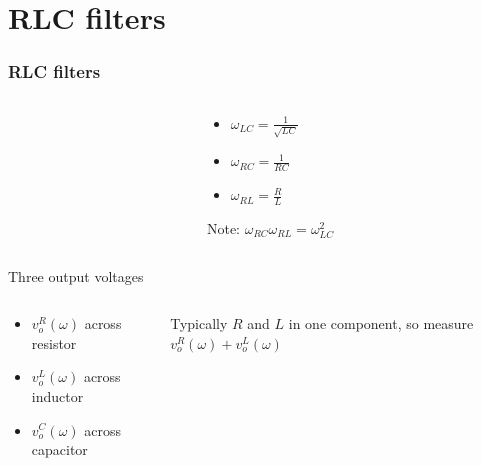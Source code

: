 \documentclass[beamer]{standalone}
\begin{document}
\section{RLC filters}
\begin{frame}
 \frametitle{RLC filters}
 \begin{columns}
  \begin{column}{0.4\textwidth}
  \end{column}
  \begin{column}{0.6\textwidth}
   \begin{itemize}
    \item $\omega_{LC} = \frac{1}{\sqrt{LC}}$
    \item $\omega_{RC} = \frac{1}{RC}$
    \item $\omega_{RL} = \frac{R}{L}$
   \end{itemize}
   Note: $\omega_{RC} \omega_{RL} = \omega^2_{LC}$
  \end{column}
 \end{columns}
 \begin{block}{Three output voltages}
  \begin{columns}
   \begin{column}{0.5\textwidth}
    \begin{itemize}
     \item $v_o^R(\omega)$ across resistor
     \item $v_o^L(\omega)$ across inductor
     \item $v_o^C(\omega)$ across capacitor
    \end{itemize}
   \end{column}
   \begin{column}{0.5\textwidth}
    Typically $R$ and $L$ in one component, so measure $v_o^R(\omega) + v_o^L(\omega)$
   \end{column}
  \end{columns}
 \end{block}
\end{frame}
\end{document}
